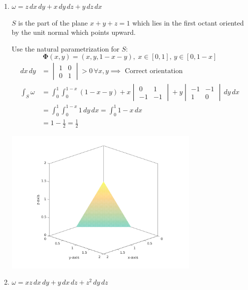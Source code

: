 \documentclass{article}
\begin{document}
\begin{enumerate}
\begin{enumerate}
        \newpage
        \item $\omega = z \, dx \, dy + x \, dy \, dz + y \, dz \, dx$

        $S$ is the part of the plane $x+y+z = 1$ which lies in the first 
        octant oriented by the unit normal which points upward.

        Use the natural parametrization for $S$:
        \[ \boldsymbol \Phi (x, y) = (x, y, 1 - x - y),\; 
        x \in [0,1],\, y \in [0, 1-x] \]
        \begin{align*}
            dx\, dy &= \begin{vmatrix} 1 & 0 \\ 0 & 1 \end{vmatrix} > 0 
            \, \forall x,y \implies \text{ Correct orientation} \\
            \int_S \omega &= 
            \int_0^1 \int_0^{1-x} (1 - x - y) 
            + x\begin{vmatrix} 0 & 1 \\ -1 & -1 \end{vmatrix}  
            + y\begin{vmatrix} -1 & -1 \\ 1 & 0 \end{vmatrix} \, dy \,dx \\
            &= \int_0^1 \int_0^{1-x} 1 \, dy \,dx = \int_0^1 1 - x \,dx \\
            &= 1 - \frac{1}{2} = \frac{1}{2} 
        \end{align*}

        \includegraphics[width=0.75\textwidth,center]{b42-a10-5b}

        \newpage
        \item $\omega  = xz \, dx \, dy + y \, dx \, dz + z^2 \, dy \, dz$
        

\end{enumerate}
\end{enumerate}
\end{document}
